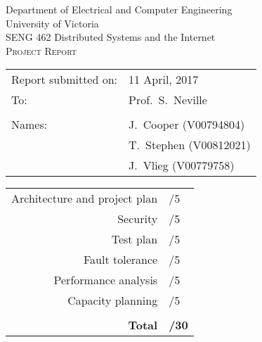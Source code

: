 \begin{titlepage}

  \begin{center}
    \begin{LARGE}
      Department of Electrical and Computer Engineering \\
      University of Victoria \\
      SENG 462 \textemdash{} Distributed Systems and the Internet \\[1cm]
      \textsc{Project Report}
      \\[1in]
    \end{LARGE}
  \end{center}

  \begin{tabular}{ p{} p{} }
    Report submitted on:& 11 April, 2017 \\
    To: & Prof.\ S.\ Neville \\
    & \\
    Names: & J.\ Cooper (V00794804)\\
    & T.\ Stephen (V00812021)\\
    & J.\ Vlieg (V00779758)\\[1in]
  \end{tabular}

  \begin{center}
    \begin{tabular}{rl}
      Architecture and project plan & \markline{} /5 \\
      Security & \markline{} /5 \\
      Test plan & \markline{} /5 \\
      Fault tolerance & \markline{} /5 \\
      Performance analysis & \markline{} /5 \\
      Capacity planning & \markline{} /5 \\
      & \\
      \textbf{Total} & \markline{} \textbf{/30} \\
    \end{tabular}
  \end{center}

\end{titlepage}

